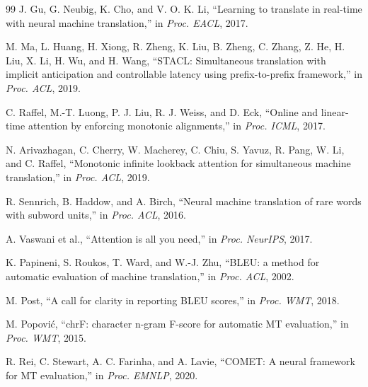 \documentclass[conference]{IEEEtran}
\begin{document}
\begin{thebibliography}{99}
J. Gu, G. Neubig, K. Cho, and V. O. K. Li, ``Learning to translate in real-time with neural machine translation,'' in \emph{Proc. EACL}, 2017.

M. Ma, L. Huang, H. Xiong, R. Zheng, K. Liu, B. Zheng, C. Zhang, Z. He, H. Liu, X. Li, H. Wu, and H. Wang, ``STACL: Simultaneous translation with implicit anticipation and controllable latency using prefix-to-prefix framework,'' in \emph{Proc. ACL}, 2019.

C. Raffel, M.-T. Luong, P. J. Liu, R. J. Weiss, and D. Eck, ``Online and linear-time attention by enforcing monotonic alignments,'' in \emph{Proc. ICML}, 2017.

N. Arivazhagan, C. Cherry, W. Macherey, C. Chiu, S. Yavuz, R. Pang, W. Li, and C. Raffel, ``Monotonic infinite lookback attention for simultaneous machine translation,'' in \emph{Proc. ACL}, 2019.

R. Sennrich, B. Haddow, and A. Birch, ``Neural machine translation of rare words with subword units,'' in \emph{Proc. ACL}, 2016.

A. Vaswani et al., ``Attention is all you need,'' in \emph{Proc. NeurIPS}, 2017.

K. Papineni, S. Roukos, T. Ward, and W.-J. Zhu, ``BLEU: a method for automatic evaluation of machine translation,'' in \emph{Proc. ACL}, 2002.

M. Post, ``A call for clarity in reporting BLEU scores,'' in \emph{Proc. WMT}, 2018.

M. Popovi\'{c}, ``chrF: character n-gram F-score for automatic MT evaluation,'' in \emph{Proc. WMT}, 2015.

R. Rei, C. Stewart, A. C. Farinha, and A. Lavie, ``COMET: A neural framework for MT evaluation,'' in \emph{Proc. EMNLP}, 2020.
\end{thebibliography}
\end{document}
